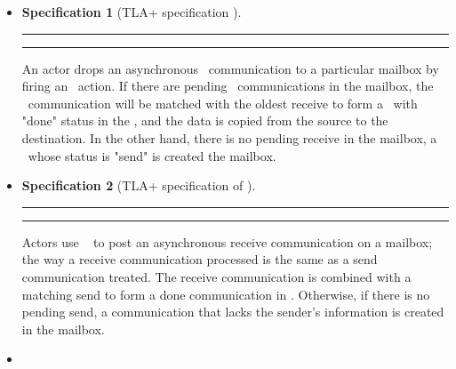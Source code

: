 \documentclass[a4paper,11pt]{article}
\theoremstyle{break}
\newtheorem{TLA}{Specification}
\begin{document}
\begin{itemize}[noitemsep]
\setlength{\itemsep}{3pt}
\item \asynsend


\begin{TLA}[TLA+ specification \asynsend]
\par\noindent\rule{\textwidth}{0.4pt}
\begin{tlatex}

\end{tlatex}
\par\noindent\rule{\textwidth}{0.4pt}
\end{TLA}

 An actor drops an asynchronous \send~communication to a particular mailbox by firing an \asynsend~action. If there are pending \receive~communications in the mailbox, the \send~communication will be matched with the oldest receive to form a \communication~with "done" status in the \Communications, and the data is copied from the source to the destination. In the other hand, there is no pending receive in the mailbox, a \communication~whose status is "send" is created the mailbox. 
\item \asynreceive


\begin{TLA}[TLA+ specification of \asynreceive]
	\par\noindent\rule{\textwidth}{0.4pt}

\begin{tlatex}
	
\end{tlatex}
\par\noindent\rule{\textwidth}{0.4pt}
\end{TLA}
Actors use \asynreceive~ to post an asynchronous receive communication on a mailbox; the way a receive communication processed is the same as a send communication treated. The receive communication is combined with a matching send to form a done communication in \Communications. Otherwise, if there is no pending send, a communication that lacks the sender's information is created in the mailbox. 
\item \test


\end{itemize}
\end{document}
